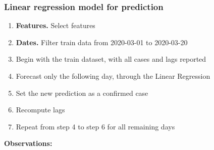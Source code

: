 \documentclass{article}
\begin{document}
\subsubsection*{Linear regression model for prediction}
\begin{enumerate}
\item \textbf{Features.} Select features
\item \textbf{Dates.} Filter train data from 2020-03-01 to 2020-03-20
\item Begin with the train dataset, with all cases and lags reported
\item Forecast only the following day, through the Linear Regression
\item Set the new prediction as a confirmed case
\item Recompute lags
\item Repeat from step 4 to step 6 for all remaining days 
\end{enumerate}
\clearpage
\textbf{Observations:}
\end{document}
